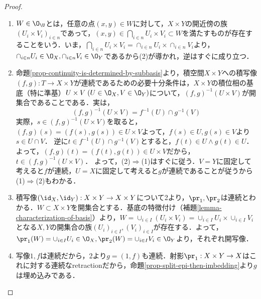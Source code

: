 \documentclass[uplatex,dvipdfmx]{jsreport}
\begin{document}
\begin{proof}\mbox{}
    \begin{enumerate}
        \item $W\in\O_\U$とは，任意の点$(x,y)\in W$に対して，$X\times Y$の開近傍の族$(U_i\times V_i)_{i\in n}$であって，$(x,y)\in\bigcap_{i\in n}U_i\times V_i\subset W$を満たすものが存在することをいう．いま，$\bigcap_{i\in n}U_i\times V_i=\cap_{i\in n}U_i\times\cap_{i\in n}V_i$より，$\cap_{i\in n}U_i\in\O_X,\cap_{i\in n}V_i\in\O_Y$であるから(2)が導かれ，逆はすぐに成り立つ．
        \item 命題\ref{prop-continuity-is-determined-by-subbasis}より，積空間$X\times Y$への積写像$(f,g):T\to X\times Y$が連続であるための必要十分条件は，$X\times Y$の積位相の基底（特に準基）$U\times V\;(U\in\O_X,V\in\O_Y)$について，$(f,g)^{-1}(U\times V)$が開集合であることである．実は，
        \begin{equation}
            (f,g)^{-1}(U\times V)=f^{-1}(U)\cap g^{-1}(V)
        \end{equation}
        実際，$s\in(f,g)^{-1}(U\times V)$を取ると，$(f,g)(s)=(f(s),g(s))\in U\times V$よって，$f(s)\in U,g(s)\in V$より$s\in U\cap V$．
        逆に$t\in f^{-1}(U)\cap g^{-1}(V)$とすると，$f(t)\in U\land g(t)\in U$．よって，$(f,g)(t)=(f(t),g(t))\in U\times V$だから，$t\in (f,g)^{-1}(U\times V)$．
        よって，(2)$\Rightarrow$(1)はすぐに従う．$V=Y$に固定して考えると$f$が連続，$U=X$に固定して考えると$g$が連続であることが従うから(1)$\Rightarrow$(2)もわかる．
        \item 積写像$(\id_X,\id_Y):X\times Y\to X\times Y$について2より，$\pr_1,\pr_2$は連続とわかる．$W\subset X\times Y$を開集合とする．基底の特徴付け（補題\ref{lemma-characterization-of-basis}）より，$W=\cup_{i\in I}(U_i\times V_i)=\cup_{i\in I}U_i\times\cup_{i\in I}V_i$となる$X,Y$の開集合の族$(U_i)_{i\in I},(V_i)_{i\in I}$が存在する．よって，$\pr_1(W)=\cup_{i\in I}U_i\in\O_X,\pr_2(W)=\cup_{i\in I}V_i\in\O_Y$より，それぞれ開写像．
        \item 写像$1,f$は連続だから，2より$g=(1,f)$も連続．射影$\pr_1:X\times Y\to X$はこれに対する連続なretractionだから，命題\ref{prop-split-epi-then-imbedding}より$g$は埋め込みである．
    \end{enumerate}
\end{proof}
\end{document}
